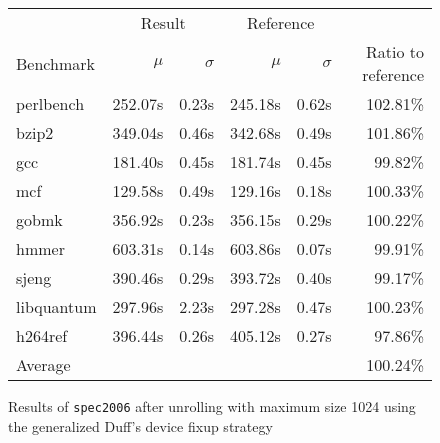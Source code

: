 \begin{figure}[th]
    \begin{center}
        \begin{tabular}{lrrrrr}
            \toprule
            & \multicolumn{2}{c}{Result} & \multicolumn{2}{c}{Reference}\\
            Benchmark & $\mu$ & $\sigma$ & $\mu$ & $\sigma$ & Ratio to reference\\
            \midrule
            perlbench & 252.07s & 0.23s & 245.18s & 0.62s & 102.81\%\\
            bzip2 & 349.04s & 0.46s & 342.68s & 0.49s & 101.86\%\\
            gcc & 181.40s & 0.45s & 181.74s & 0.45s & 99.82\%\\
            mcf & 129.58s & 0.49s & 129.16s & 0.18s & 100.33\%\\
            gobmk & 356.92s & 0.23s & 356.15s & 0.29s & 100.22\%\\
            hmmer & 603.31s & 0.14s & 603.86s & 0.07s & 99.91\%\\
            sjeng & 390.46s & 0.29s & 393.72s & 0.40s & 99.17\%\\
            libquantum & 297.96s & 2.23s & 297.28s & 0.47s & 100.23\%\\
            h264ref & 396.44s & 0.26s & 405.12s & 0.27s & 97.86\%\\
            \midrule
            Average & & & & & 100.24\%\\
            \bottomrule
        \end{tabular}
    \end{center}
    \caption{Results of \texttt{spec2006} after unrolling with maximum size 1024 using the generalized Duff's device fixup strategy}
    \label{fig:eval:perf:duff:1024}
\end{figure}